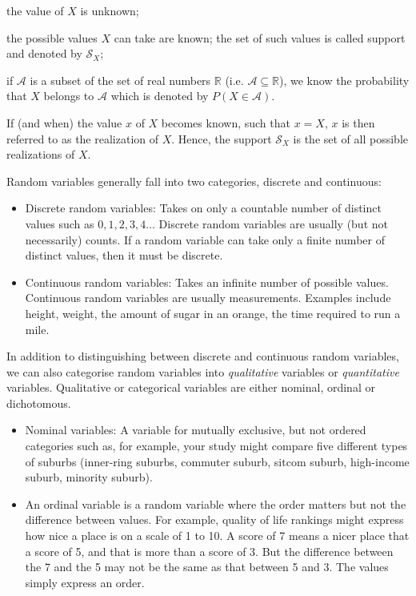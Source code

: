 \begin{inparaenum}
\item the value of $X$ is unknown;
\item the possible values $X$ can take are known; the set of such values is called support and denoted by $\bm{\mathcal{S}}_{X}$;
\item if $\bm{\mathcal{A}}$  is a subset of the set of real numbers $\mathbb{R}$  (i.e. $\bm{\mathcal{A}}\subseteq \mathbb{R}$), we know the probability that $X$ belongs to $\bm{\mathcal{A}}$ which is denoted by $P(X\in\bm{\mathcal{A}})$.
\item If (and when) the value $x$ of $X$  becomes known, such that $x=X$, $x$ is then referred to as the realization of $X$. Hence, the support $\bm{\mathcal{S}}_{X}$  is the set of all possible realizations of $X$.
\end{inparaenum}

Random variables generally fall into two categories, discrete and continuous:

\begin{itemize}
\item Discrete random variables: Takes on only a countable number of distinct values such as $0,1,2,3,4 \ldots$ Discrete random variables are usually (but not necessarily) counts. If a random variable can take only a finite number of distinct values, then it must be discrete.
\item Continuous random variables: Takes an infinite number of possible values. Continuous random variables are usually measurements. Examples include height, weight, the amount of sugar in an orange, the time required to run a mile.
\end{itemize}

In addition to distinguishing between discrete and continuous random variables, we can also categorise random variables into \emph{qualitative} variables or \emph{quantitative} variables. Qualitative or categorical variables are either nominal, ordinal or dichotomous. 

\begin{itemize}
\item Nominal variables:  A variable for mutually exclusive, but not ordered categories such as, for example, your study might compare five different types of suburbs (inner-ring suburbs, commuter suburb, sitcom suburb, high-income suburb, minority suburb). 
\item An ordinal variable is a random variable where the order matters but not the difference between values. For example, quality of life rankings might express how nice a place is on a scale of 1 to 10. A score of 7 means a nicer place that a score of 5, and that is more than a score of 3. But the difference between the 7 and the 5 may not be the same as that between 5 and 3. The values simply express an order. 
\end{itemize}

